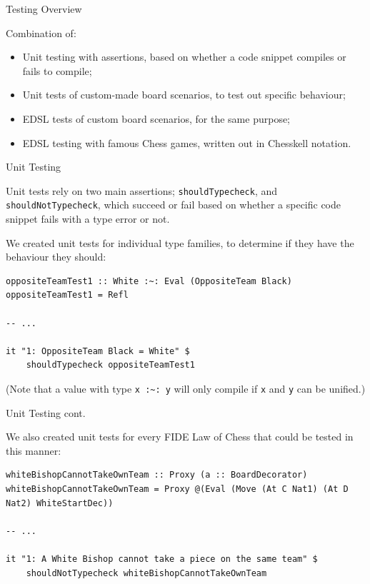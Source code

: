 \documentclass{beamer}
\newcommand{\inline}[1]{\lstinline[basicstyle=\ttfamily]{#1}}
\begin{document}
\begin{frame}{Testing Overview}

Combination of:

\pause

\begin{itemize}
    \item<2-> Unit testing with assertions, based on whether a code snippet compiles or fails to compile;
    \item<3-> Unit tests of custom-made board scenarios, to test out specific behaviour;
    \item<4-> EDSL tests of custom board scenarios, for the same purpose;  
    \item<5-> EDSL testing with famous Chess games, written out in Chesskell notation.
\end{itemize}
    
\end{frame}

\begin{frame}[fragile]{Unit Testing}

Unit tests rely on two main assertions; \inline{shouldTypecheck}, and \inline{shouldNotTypecheck}, which succeed or fail based on whether a specific code snippet fails with a type error or not.

We created unit tests for individual type families, to determine if they have the behaviour they should:

\begin{lstlisting}
oppositeTeamTest1 :: White :~: Eval (OppositeTeam Black)
oppositeTeamTest1 = Refl

-- ...

it "1: OppositeTeam Black = White" $
    shouldTypecheck oppositeTeamTest1
\end{lstlisting}

(Note that a value with type \inline{x :~: y} will only compile if \inline{x} and \inline{y} can be unified.)
    
\end{frame}

\begin{frame}[fragile]{Unit Testing cont.}

We also created unit tests for every FIDE Law of Chess that could be tested in this manner:

\begin{lstlisting}
whiteBishopCannotTakeOwnTeam :: Proxy (a :: BoardDecorator)
whiteBishopCannotTakeOwnTeam = Proxy @(Eval (Move (At C Nat1) (At D Nat2) WhiteStartDec))

-- ...

it "1: A White Bishop cannot take a piece on the same team" $
    shouldNotTypecheck whiteBishopCannotTakeOwnTeam
\end{lstlisting}
    
\end{frame}
\end{document}
